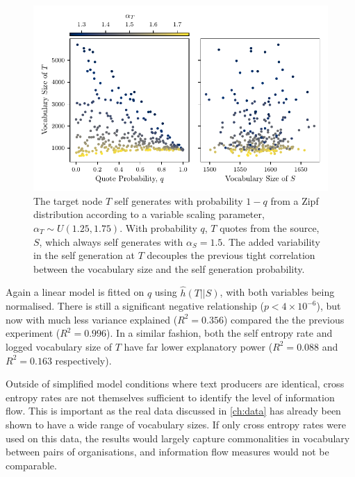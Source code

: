 \begin{figure}[!htbp]
\centering
\includegraphics{chapter3/figs/VariableAlphaVocabSize.pdf}
\caption{The target node $T$ self generates with probability $1-q$ from a Zipf distribution according to a variable scaling parameter, $\alpha_T \sim U(1.25, 1.75)$. With probability $q$, $T$ quotes from the source, $S$, which always self generates with $\alpha_S = 1.5$. The added variability in the self generation at $T$ decouples the previous tight correlation between the vocabulary size and the self generation probability. }\label{fig:flow_variablealphascatterplot}
\end{figure}

Again a linear model is fitted on $q$ using $\hat{h}(T||S)$, with both variables being normalised. There is still a significant negative relationship ($p< 4\times10^{-6}$), but now with much less variance explained ($R^2 = 0.356$) compared the the previous experiment ($R^2=0.996$). In a similar fashion, both the self entropy rate and logged vocabulary size of $T$ have far lower explanatory power ($R^2=0.088$ and $R^2=0.163$ respectively).

Outside of simplified model conditions where text producers are identical, cross entropy rates are not themselves sufficient to identify the level of information flow. This is important as the real data discussed in \autoref{ch:data} has already been shown to have a wide range of vocabulary sizes. If only cross entropy rates were used on this data, the results would largely capture commonalities in vocabulary between pairs of organisations, and information flow measures would not be comparable. 

